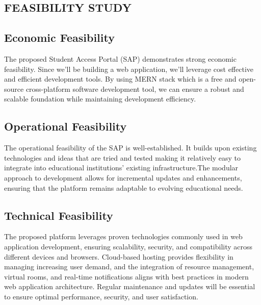\begin{center}
\section{FEASIBILITY STUDY}
\end{center}
\subsection{Economic Feasibility}
The proposed Student Access Portal (SAP) demonstrates strong economic feasibility. Since we'll be building a web application, we'll leverage cost effective and efficient development tools. By using MERN stack which is a free and open-source cross-platform software development tool, we can ensure a robust and scalable foundation while maintaining development efficiency.

\subsection{Operational Feasibility}
The operational feasibility of the SAP is well-established. It builds upon existing technologies and ideas that are tried and tested making it relatively easy to integrate into educational institutions' existing infrastructure.The modular approach to development allows for incremental updates and enhancements, ensuring that the platform remains adaptable to evolving educational needs.

\subsection{Technical Feasibility}
The proposed platform leverages proven technologies commonly used in web application development, ensuring scalability, security, and compatibility across different devices and browsers. Cloud-based hosting provides flexibility in managing increasing user demand, and the integration of resource management, virtual rooms, and real-time notifications aligns with best practices in modern web application architecture. Regular maintenance and updates will be essential to ensure optimal performance, security, and user satisfaction.
\newpage